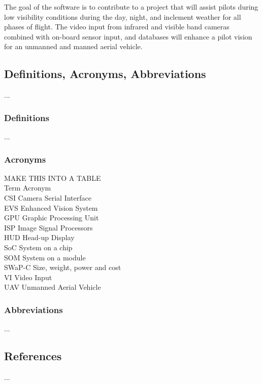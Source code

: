 \documentclass[letterpaper,10pt,serif,draftclsnofoot,onecolumn,compsoc,titlepage]{IEEEtran}
\begin{document}
The goal of the software is to contribute to a project that will assist pilots during 
low visibility conditions during the day, night, and inclement weather for all phases 
of flight. The video input from infrared and visible band cameras combined with 
on-board sensor input, and databases will enhance a pilot vision for an unmanned and 
manned aerial vehicle.\\

\subsection{Definitions, Acronyms, Abbreviations}

...

\subsubsection{Definitions}

...

\subsubsection{Acronyms}

MAKE THIS INTO A TABLE\\
Term
Acronym\\
CSI
Camera Serial Interface\\
EVS
Enhanced Vision System\\
GPU
Graphic Processing Unit\\
ISP
Image Signal Processors\\
HUD
Head-up Display\\
SoC
System on a chip\\
SOM
System on a module\\
SWaP-C
Size, weight, power and cost\\
VI
Video Input\\
UAV
Unmanned Aerial Vehicle\\

\subsubsection{Abbreviations}

...

\subsection{References}

...
\end{document}
